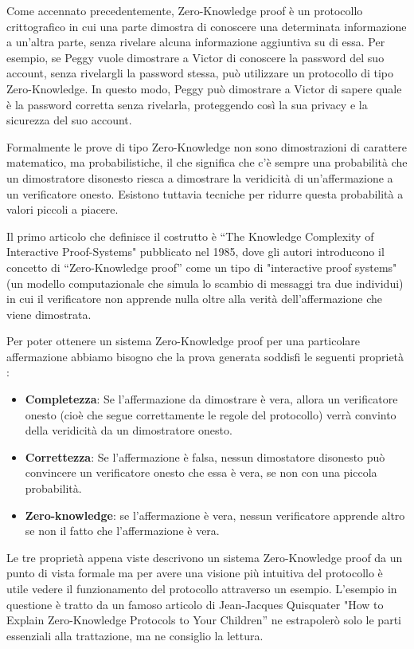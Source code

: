 Come accennato precedentemente, Zero-Knowledge proof è un protocollo crittografico in cui una parte dimostra di
conoscere una determinata informazione a un'altra parte, senza rivelare alcuna informazione aggiuntiva su di essa. Per
esempio, se Peggy vuole dimostrare a Victor di conoscere la password del suo account, senza rivelargli la password stessa,
può utilizzare un protocollo di tipo Zero-Knowledge. In questo modo, Peggy può dimostrare a Victor di sapere quale è la
password corretta senza rivelarla, proteggendo così la sua privacy e la sicurezza del suo account.

Formalmente le prove di tipo Zero-Knowledge non sono dimostrazioni di carattere matematico, ma probabilistiche, il che
significa che c'è sempre una probabilità che un dimostratore disonesto riesca a dimostrare la veridicità di
un'affermazione a un verificatore onesto. Esistono tuttavia tecniche per ridurre questa probabilità a valori piccoli a
piacere.

Il primo articolo che definisce il costrutto è “The Knowledge Complexity of Interactive Proof-Systems"\cite{10.1145/22145.22178} pubblicato nel
1985, dove  gli autori introducono il concetto di “Zero-Knowledge proof” come un tipo di "interactive proof
systems" \cite{interactive_proof_system} (un modello computazionale che simula lo scambio di
messaggi tra due individui) in cui il verificatore non apprende nulla oltre alla verità dell'affermazione che viene
dimostrata.

Per poter ottenere un sistema Zero-Knowledge proof per una particolare affermazione abbiamo bisogno che la prova
generata soddisfi le seguenti proprietà :
\begin{itemize}
    \item \textbf{Completezza}: Se l'affermazione da dimostrare è vera, allora un verificatore onesto (cioè che segue correttamente le
    regole del protocollo) verrà convinto della veridicità da un dimostratore onesto.
    \item \textbf{Correttezza}: Se l'affermazione è falsa, nessun dimostatore disonesto può convincere un verificatore onesto che essa è vera, se non con una piccola
    probabilità.
    \item \textbf{Zero-knowledge}: se l'affermazione è vera, nessun verificatore apprende altro se non il fatto che
    l'affermazione è vera.
\end{itemize}
Le tre proprietà appena viste descrivono un sistema Zero-Knowledge proof da un punto di vista formale ma per avere una visione più
intuitiva del protocollo è utile vedere il funzionamento del protocollo attraverso un esempio. L’esempio in questione è tratto
da un famoso articolo di Jean-Jacques Quisquater "How to Explain Zero-Knowledge Protocols to Your Children” \cite{10.1007/0-387-34805-0_60}  ne
estrapolerò solo le parti essenziali alla trattazione, ma ne consiglio la lettura.

